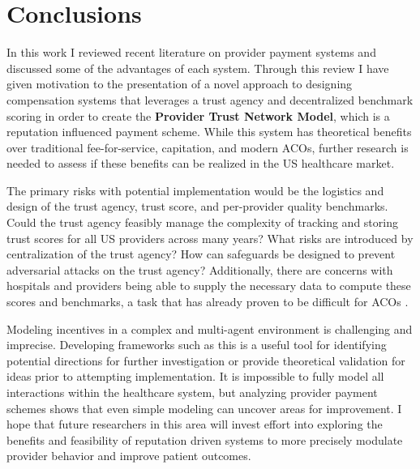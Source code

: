 \documentclass{article}
\begin{document}
\section{Conclusions}
In this work I reviewed recent literature on provider payment systems and discussed some of the advantages of each system. Through this review I have given motivation to the presentation of a novel approach to designing compensation systems that leverages a trust agency and decentralized benchmark scoring in order to create the \textbf{Provider Trust Network Model}, which is a reputation influenced payment scheme. While this system has theoretical benefits over traditional fee-for-service, capitation, and modern ACOs, further research is needed to assess if these benefits can be realized in the US healthcare market.

The primary risks with potential implementation would be the logistics and design of the trust agency, trust score, and per-provider quality benchmarks. Could the trust agency feasibly manage the complexity of tracking and storing trust scores for all US providers across many years? What risks are introduced by centralization of the trust agency? How can safeguards be designed to prevent adversarial attacks on the trust agency? Additionally, there are concerns with hospitals and providers being able to supply the necessary data to compute these scores and benchmarks, a task that has already proven to be difficult for ACOs \cite{acoecon}.

Modeling incentives in a complex and multi-agent environment is challenging and imprecise. Developing frameworks such as this is a useful tool for identifying potential directions for further investigation or provide theoretical validation for ideas prior to attempting implementation. It is impossible to fully model all interactions within the healthcare system, but analyzing provider payment schemes shows that even simple modeling can uncover areas for improvement. I hope that future researchers in this area will invest effort into exploring the benefits and feasibility of reputation driven systems to more precisely modulate provider behavior and improve patient outcomes.



\clearpage
\end{document}
